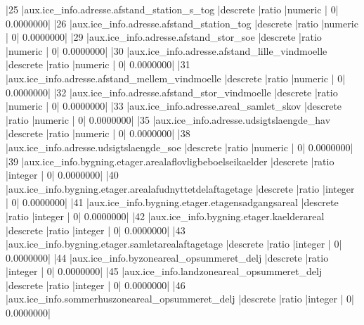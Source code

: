 \documentclass{report}
\begin{document}
\begin{Schunk}
\begin{Soutput}
|25  |aux.ice_info.adresse.afstand_station_s_tog                    |descrete           |ratio          |numeric         |              0|          0.0000000|
|26  |aux.ice_info.adresse.afstand_station_tog                      |descrete           |ratio          |numeric         |              0|          0.0000000|
|29  |aux.ice_info.adresse.afstand_stor_soe                         |descrete           |ratio          |numeric         |              0|          0.0000000|
|30  |aux.ice_info.adresse.afstand_lille_vindmoelle                 |descrete           |ratio          |numeric         |              0|          0.0000000|
|31  |aux.ice_info.adresse.afstand_mellem_vindmoelle                |descrete           |ratio          |numeric         |              0|          0.0000000|
|32  |aux.ice_info.adresse.afstand_stor_vindmoelle                  |descrete           |ratio          |numeric         |              0|          0.0000000|
|33  |aux.ice_info.adresse.areal_samlet_skov                        |descrete           |ratio          |numeric         |              0|          0.0000000|
|35  |aux.ice_info.adresse.udsigtslaengde_hav                       |descrete           |ratio          |numeric         |              0|          0.0000000|
|38  |aux.ice_info.adresse.udsigtslaengde_soe                       |descrete           |ratio          |numeric         |              0|          0.0000000|
|39  |aux.ice_info.bygning.etager.arealaflovligbeboelseikaelder     |descrete           |ratio          |integer         |              0|          0.0000000|
|40  |aux.ice_info.bygning.etager.arealafudnyttetdelaftagetage      |descrete           |ratio          |integer         |              0|          0.0000000|
|41  |aux.ice_info.bygning.etager.etagensadgangsareal               |descrete           |ratio          |integer         |              0|          0.0000000|
|42  |aux.ice_info.bygning.etager.kaelderareal                      |descrete           |ratio          |integer         |              0|          0.0000000|
|43  |aux.ice_info.bygning.etager.samletarealaftagetage             |descrete           |ratio          |integer         |              0|          0.0000000|
|44  |aux.ice_info.byzoneareal_opsummeret_delj                      |descrete           |ratio          |integer         |              0|          0.0000000|
|45  |aux.ice_info.landzoneareal_opsummeret_delj                    |descrete           |ratio          |integer         |              0|          0.0000000|
|46  |aux.ice_info.sommerhuszoneareal_opsummeret_delj               |descrete           |ratio          |integer         |              0|          0.0000000|

\end{Soutput}
\end{Schunk}
\end{document}
